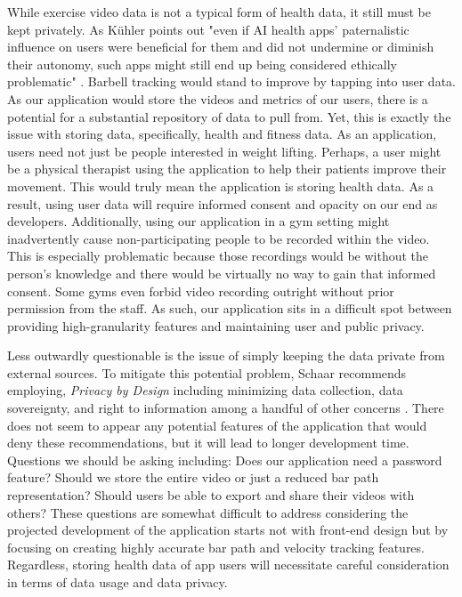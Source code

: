 \documentclass[10pt,twocolumn]{article}
\begin{document}
While exercise video data is not a typical form of health data, it still must be kept privately.
As Kühler points out "even if AI health apps’ paternalistic influence on users were beneficial for them and did not undermine or diminish their autonomy, such apps might still end up being considered ethically problematic" \cite{Kuhler2022}. 
Barbell tracking would stand to improve by tapping into user data. 
As our application would store the videos and metrics of our users, there is a potential for a substantial repository of data to pull from. 
Yet, this is exactly the issue with storing data, specifically, health and fitness data. 
As an application, users need not just be people interested in weight lifting.
Perhaps, a user might be a physical therapist using the application to help their patients improve their movement. 
This would truly mean the application is storing health data. 
As a result, using user data will require informed consent and opacity on our end as developers. 
Additionally, using our application in a gym setting might inadvertently cause non-participating people to be recorded within the video. 
This is especially problematic because those recordings would be without the person's knowledge and there would be virtually no way to gain that informed consent.
Some gyms even forbid video recording outright without prior permission from the staff.
As such, our application sits in a difficult spot between providing high-granularity features and maintaining user and public privacy. \par

Less outwardly questionable is the issue of simply keeping the data private from external sources.
To mitigate this potential problem, Schaar recommends employing, \textit{Privacy by Design} including minimizing data collection, data sovereignty, and right to information among a handful of other concerns \cite{Schaar2010}. 
There does not seem to appear any potential features of the application that would deny these recommendations, but it will lead to longer development time.
Questions we should be asking including: Does our application need a password feature? Should we store the entire video or just a reduced bar path representation? Should users be able to export and share their videos with others?
These questions are somewhat difficult to address considering the projected development of the application starts not with front-end design but by focusing on creating highly accurate bar path and velocity tracking features.
Regardless, storing health data of app users will necessitate careful consideration in terms of data usage and data privacy.
\end{document}
